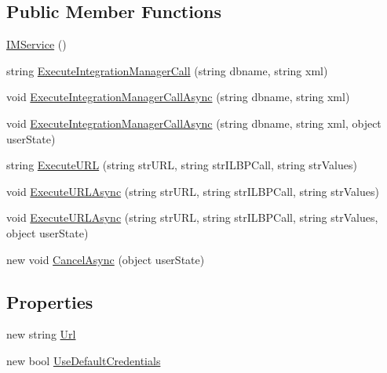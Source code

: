 \subsection*{Public Member Functions}
\begin{DoxyCompactItemize}
\item 
\mbox{\hyperlink{class_g_f_s_c_1_1_services_1_1_end_of_term_1_1_i_m_service_1_1_i_m_service_a6ee36b9468fc8131dcf4bfdcb516a748}{I\+M\+Service}} ()
\item 
string \mbox{\hyperlink{class_g_f_s_c_1_1_services_1_1_end_of_term_1_1_i_m_service_1_1_i_m_service_a9e4f9e60ebc85b63b8a448d2a0c6ccf6}{Execute\+Integration\+Manager\+Call}} (string dbname, string xml)
\item 
void \mbox{\hyperlink{class_g_f_s_c_1_1_services_1_1_end_of_term_1_1_i_m_service_1_1_i_m_service_ae4a9f55da33e9583cc6c808ab08cc813}{Execute\+Integration\+Manager\+Call\+Async}} (string dbname, string xml)
\item 
void \mbox{\hyperlink{class_g_f_s_c_1_1_services_1_1_end_of_term_1_1_i_m_service_1_1_i_m_service_a37d60d9cec4bef330aa866696c06b5c5}{Execute\+Integration\+Manager\+Call\+Async}} (string dbname, string xml, object user\+State)
\item 
string \mbox{\hyperlink{class_g_f_s_c_1_1_services_1_1_end_of_term_1_1_i_m_service_1_1_i_m_service_a55bf5002d01474a5d2d4f829fe6b5203}{Execute\+U\+RL}} (string str\+U\+RL, string str\+I\+L\+B\+P\+Call, string str\+Values)
\item 
void \mbox{\hyperlink{class_g_f_s_c_1_1_services_1_1_end_of_term_1_1_i_m_service_1_1_i_m_service_a1baa9b79670b389bd5b9f03e6a0af623}{Execute\+U\+R\+L\+Async}} (string str\+U\+RL, string str\+I\+L\+B\+P\+Call, string str\+Values)
\item 
void \mbox{\hyperlink{class_g_f_s_c_1_1_services_1_1_end_of_term_1_1_i_m_service_1_1_i_m_service_a22af41fd79879d7c0f170c876e885afc}{Execute\+U\+R\+L\+Async}} (string str\+U\+RL, string str\+I\+L\+B\+P\+Call, string str\+Values, object user\+State)
\item 
new void \mbox{\hyperlink{class_g_f_s_c_1_1_services_1_1_end_of_term_1_1_i_m_service_1_1_i_m_service_a4aeb4a181b1f9be8a5dfe621d9aad640}{Cancel\+Async}} (object user\+State)
\end{DoxyCompactItemize}
\subsection*{Properties}
\begin{DoxyCompactItemize}
\item 
new string \mbox{\hyperlink{class_g_f_s_c_1_1_services_1_1_end_of_term_1_1_i_m_service_1_1_i_m_service_a195907a6c53e8eae092945bcd23238a4}{Url}}
\item 
new bool \mbox{\hyperlink{class_g_f_s_c_1_1_services_1_1_end_of_term_1_1_i_m_service_1_1_i_m_service_a4d9ac0412c01e21f5d0382dbd0188573}{Use\+Default\+Credentials}}
\end{DoxyCompactItemize}
